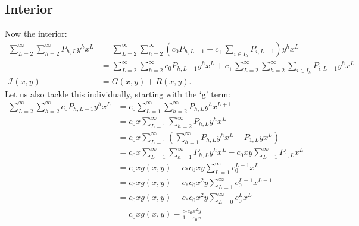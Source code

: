	\subsection{Interior}
	Now the interior:
	\begin{align}
		\sum_{L=2}^\infty\sum_{h=2}^\infty P_{h, L} y^hx^L &= \sum_{L=2}^\infty\sum_{h=2}^\infty \left(c_0P_{h, L - 1} + c_+ \sum_{i\in I_h} P_{i, L-1}\right) y^hx^L\\
		&= \sum_{L=2}^\infty\sum_{h=2}^\infty c_0P_{h, L - 1}y^hx^L + c_+ \sum_{L=2}^\infty\sum_{h=2}^\infty\sum_{i\in I_h} P_{i, L-1}y^hx^L\\
		\mathcal{I}(x, y)&= G(x, y) + R(x, y).
	\end{align}
	Let us also tackle this individually, starting with the `g' term:
	\begin{align}
		\sum_{L=2}^\infty\sum_{h=2}^\infty c_0P_{h, L - 1}y^hx^L &= c_0\sum_{L=1}^\infty\sum_{h=2}^\infty P_{h, L}y^hx^{L+1}\\
		&= c_0x\sum_{L=1}^\infty\sum_{h=2}^\infty P_{h, L}y^hx^L\\
		&= c_0x\sum_{L=1}^\infty\left( \sum_{h=1}^\infty P_{h, L}y^hx^L -  P_{1, L}yx^L\right)\\
		&= c_0x\sum_{L=1}^\infty\sum_{h=1}^\infty P_{h, L}y^hx^L -  c_0xy\sum_{L=1}^\infty P_{1, L}x^L\\
		&= c_0xg(x, y) -  c_* c_0xy\sum_{L=1}^\infty c_0^{L-1}x^L\\
		&= c_0xg(x, y) -  c_* c_0x^2y\sum_{L=1}^\infty c_0^{L-1}x^{L-1}\\
		&= c_0xg(x, y) -  c_* c_0 x^2y \sum_{L=0}^\infty c_0^{L}x^L\\
		&= c_0xg(x, y) -  \frac{c_* c_0x^2y}{1-c_0x}\\
	\end{align}
	
